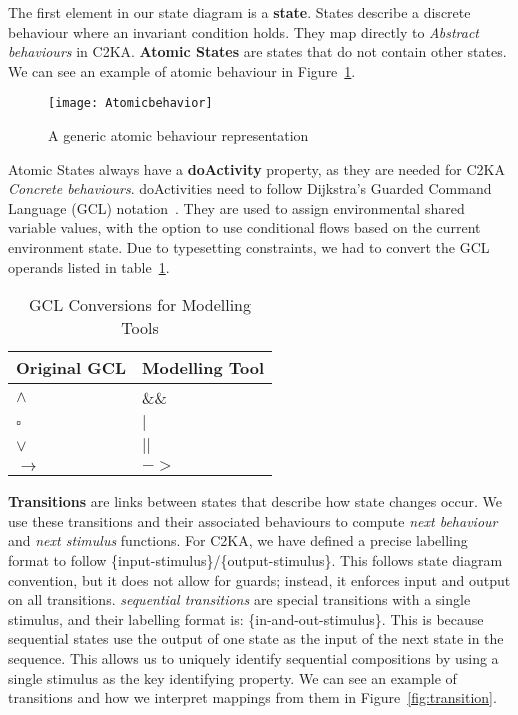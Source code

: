 The first element in our state diagram is a \textbf{state}.
States describe a discrete behaviour where an invariant condition holds.
They map directly to \textit{Abstract behaviours} in C2KA\@.
\textbf{Atomic States} are states that do not contain other states.
We can see an example of atomic behaviour in Figure~\ref{fig:atomicbehaviour}.

\begin{figure}[ht]
    \centering
    \texttt{[image: Atomicbehavior]}
    \caption{A generic atomic behaviour representation}
    \label{fig:atomicbehaviour}
\end{figure}

\newpage
Atomic States always have a \textbf{doActivity} property,
as they are needed for C2KA \textit{Concrete behaviours}.
doActivities need to follow Dijkstra's Guarded Command Language (GCL) notation~\cite{gcl}.
They are used to assign environmental shared variable values,
with the option to use conditional flows based on the current environment state.
Due to typesetting constraints, we had to convert the GCL operands listed in table~\ref{tab:gcl-equivalence}.
\begin{table}[htbp]
    \centering
    \caption{GCL Conversions for Modelling Tools}\label{tab:gcl-equivalence}
    \begin{tabular}{| l | l |}
        \hline
        \textbf{Original GCL} & \textbf{Modelling Tool} \\
        \hline
        $\land$ & \&\& \\ \hline
        $\square$ & $|$ \\ \hline
        $\lor$ & $||$ \\ \hline
        $\rightarrow$ & $->$ \\ \hline
    \end{tabular}
\end{table}

\textbf{Transitions} are links between states that describe how state changes occur.
We use these transitions and their associated behaviours to compute \textit{next behaviour} and \textit{next stimulus} functions.
For C2KA, we have defined a precise labelling format to follow \{input-stimulus\}/\{output-stimulus\}.
This follows state diagram convention, but it does not allow for guards; instead, it enforces input and output on all transitions.
\textit{sequential transitions} are special transitions with a single stimulus, and their labelling format is: \{in-and-out-stimulus\}.
This is because sequential states use the output of one state as the input of the next state in the sequence.
This allows us to uniquely identify sequential compositions by using a single stimulus as the key identifying property.
We can see an example of transitions and how we interpret mappings from them in Figure~\ref{fig:transition}.

